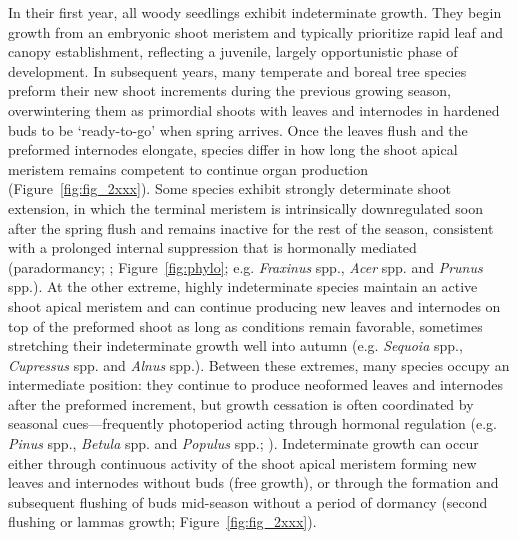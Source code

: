 \documentclass{article}
\begin{document}
	In their first year, all woody seedlings exhibit indeterminate growth. They begin growth from an embryonic shoot meristem and typically prioritize rapid leaf and canopy establishment, reflecting a juvenile, largely opportunistic phase of development\citep{borchertConceptJuvenilityWoody1976}. In subsequent years, many temperate and boreal tree species preform their new shoot increments during the previous growing season, overwintering them as primordial shoots with leaves and internodes in hardened buds to be `ready-to-go' when spring arrives. Once the leaves flush and the preformed internodes elongate, species differ in how long the shoot apical meristem remains competent to continue organ production (Figure~\ref{fig:fig_2xxx}). Some species exhibit strongly determinate shoot extension, in which the terminal meristem is intrinsically downregulated soon after the spring flush and remains inactive for the rest of the season, consistent with a prolonged internal suppression that is hormonally mediated (paradormancy; \citealp{langEndoParaEcodormancy1987}; Figure~\ref{fig:phylo}; e.g. \textit{Fraxinus} spp., \textit{Acer} spp. and \textit{Prunus} spp.). 	
	At the other extreme, highly indeterminate species maintain an active shoot apical meristem and can continue producing new leaves and internodes on top of the preformed shoot as long as conditions remain favorable, sometimes stretching their indeterminate growth well into autumn (e.g. \textit{Sequoia} spp., \textit{Cupressus} spp. and \textit{Alnus} spp.). %
	Between these extremes, many species occupy an intermediate position: they continue to produce neoformed leaves and internodes after the preformed increment, but growth cessation is often coordinated by seasonal cues—frequently photoperiod acting through hormonal regulation (e.g. \textit{Pinus} spp., \textit{Betula} spp. and \textit{Populus} spp.; \citealp{mauryaPhotoperiodTemperaturemediatedControl2017, triozziPhotoperiodicRegulationShoot2018, bohleniusCOFTRegulatory2006a}). Indeterminate growth can occur either through continuous activity of the shoot apical meristem forming new leaves and internodes without buds (free growth), or through the formation and subsequent flushing of buds mid-season without a period of dormancy (second flushing or lammas growth; Figure~\ref{fig:fig_2xxx}).\\
	
\end{document}
